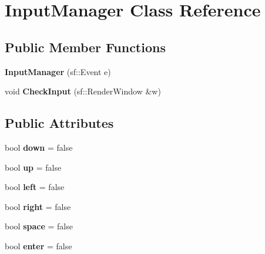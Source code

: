 \hypertarget{class_input_manager}{}\section{Input\+Manager Class Reference}
\label{class_input_manager}
\subsection*{Public Member Functions}
\begin{DoxyCompactItemize}
\item 
\mbox{\label{class_input_manager_a2ce4272efdb32d49062e5ab8510d40db}} 
{\bfseries Input\+Manager} (sf\+::\+Event e)
\item 
\mbox{\label{class_input_manager_a68354329a7fd5759683d574d7bef379d}} 
void {\bfseries Check\+Input} (sf\+::\+Render\+Window \&w)
\end{DoxyCompactItemize}
\subsection*{Public Attributes}
\begin{DoxyCompactItemize}
\item 
\mbox{\label{class_input_manager_a4240240a3abbcf7c30993540943459d0}} 
bool {\bfseries down} = false
\item 
\mbox{\label{class_input_manager_a4c679f97dcd46cede33e578aac3330b2}} 
bool {\bfseries up} = false
\item 
\mbox{\label{class_input_manager_aaf5bcc6e96d648ebf401f3422b7fbd80}} 
bool {\bfseries left} = false
\item 
\mbox{\label{class_input_manager_a85245016ee1ebb890ea7f2cbc4717f92}} 
bool {\bfseries right} = false
\item 
\mbox{\label{class_input_manager_a96724f98d0061cfedda967543d83456f}} 
bool {\bfseries space} = false
\item 
\mbox{\label{class_input_manager_ace68c9ce14a8f347670fb7ac82101686}} 
bool {\bfseries enter} = false
\end{DoxyCompactItemize}
